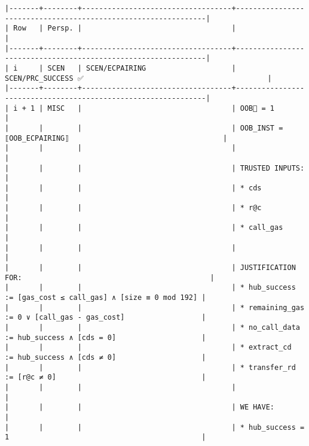\documentclass[varwidth=\maxdimen,margin=0.5cm,multi={verbatim}]{standalone}
\begin{document}
\begin{verbatim}
|-------+--------+-----------------------------------+---------------------------------------------------------------|
| Row   | Persp. |                                   |                                                               |
|-------+--------+-----------------------------------+---------------------------------------------------------------|
| i     | SCEN   | SCEN/ECPAIRING                    | SCEN/PRC_SUCCESS ✅                                           |
|-------+--------+-----------------------------------+---------------------------------------------------------------|
| i + 1 | MISC   |                                   | OOB🚩 = 1                                                     |
|       |        |                                   | OOB_INST = ⟦OOB_ECPAIRING⟧                                    |
|       |        |                                   |                                                               |
|       |        |                                   | TRUSTED INPUTS:                                               |
|       |        |                                   | * cds                                                         |
|       |        |                                   | * r@c                                                         |
|       |        |                                   | * call_gas                                                    |
|       |        |                                   |                                                               |
|       |        |                                   | JUSTIFICATION FOR:                                            |
|       |        |                                   | * hub_success   := [gas_cost ≤ call_gas] ∧ [size ≡ 0 mod 192] |
|       |        |                                   | * remaining_gas := 0 ∨ [call_gas - gas_cost]                  |
|       |        |                                   | * no_call_data  := hub_success ∧ [cds = 0]                    |
|       |        |                                   | * extract_cd    := hub_success ∧ [cds ≠ 0]                    |
|       |        |                                   | * transfer_rd   := [r@c ≠ 0]                                  |
|       |        |                                   |                                                               |
|       |        |                                   | WE HAVE:                                                      |
|       |        |                                   | * hub_success = 1                                             |

\end{verbatim}
\end{document}
